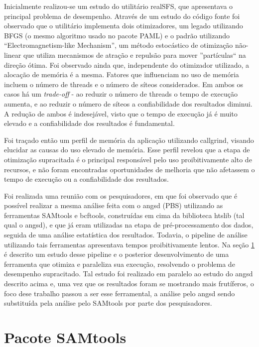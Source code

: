 \documentclass[cic,tc]{iiufrgs}
\begin{document}
Inicialmente realizou-se um estudo do utilitário realSFS, que apresentava o
principal problema de desempenho. Através de um estudo do código fonte foi
observado que o utilitário implementa dois otimizadores, um legado utilizando
BFGS (o mesmo algoritmo usado no pacote PAML) e o padrão utilizando
``Electromagnetism-like Mechanism'', um método estocástico de otimização
não-linear que utiliza mecanismos de atração e repulsão para mover
''partículas`` na direção ótima.\cite{5636954} Foi observado ainda que,
independente do otimizador utilizado, a alocação de memória é a mesma. Fatores
que influenciam no uso de memória incluem o número de threads e o número de
síteos considerados. Em ambos os casos há um \textit{trade-off} - ao reduzir o
número de threads o tempo de execução aumenta, e ao reduzir o número de síteos
a confiabilidade dos resultados diminui.\cite{popgen2016angsd} A redução de
ambos é indesejável, visto que o tempo de execução já é muito elevado e a
confiabilidade dos resultados é fundamental.

Foi traçado então um perfil de memória da aplicação utilizando callgrind,
visando elucidar as causas do uso elevado de memória. Esse perfil revelou que a
etapa de otimização supracitada é o principal responsável pelo uso
proibitivamente alto de recursos, e não foram encontradas oportunidades de
melhoria que não afetassem o tempo de execução ou a confiabilidade dos
resultados.

Foi realizada uma reunião com os pesquisadores, em que foi observado que é
possível realizar a mesma análise feita com o angsd (PBS) utilizando as
ferramentas SAMtools e bcftools, construídas em cima da biblioteca htslib (tal
qual o angsd), e que já eram utilizadas na etapa de pré-processamento dos
dados, seguida de uma análise estatística dos resultados. Todavia, o pipeline
de análise utilizando tais ferramentas apresentava tempos proibitivamente
lentos. Na seção \ref{sec:SAMtools} é descrito um estudo desse pipeline e o
posterior desenvolvimento de uma ferramenta que otimiza e paraleliza sua
execução, resolvendo o problema de desempenho supracitado. Tal estudo foi
realizado em paralelo ao estudo do angsd descrito acima e, uma vez que os
resultados foram se mostrando mais frutíferos, o foco dese trabalho passou a
ser esse ferramental, a análise pelo angsd sendo substituída pela análise pelo
SAMtools por parte dos pesquisadores.

\chapter{Pacote SAMtools}
\label{sec:SAMtools}
\end{document}
